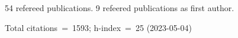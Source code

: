 54 refereed publications. 9 refeered publications as first author.

Total citations~=~1593; h-index~=~25 (2023-05-04)